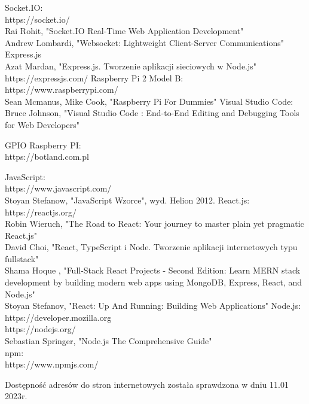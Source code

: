 \begin{thebibliography}{1}
 Socket.IO:
\\
https://socket.io/
\\
Rai Rohit, "Socket.IO Real-Time Web Application Development"
\\
Andrew Lombardi, "Websocket: Lightweight Client-Server Communications"
 Express.js
\\
Azat Mardan, "Express.js. Tworzenie aplikacji sieciowych w Node.js"
https://expressjs.com/
Raspberry Pi 2 Model B:
\\
https://www.raspberrypi.com/
\\
 Sean Mcmanus, Mike Cook, "Raspberry Pi For Dummies"
Visual Studio Code:
\\
Bruce Johnson, "Visual Studio Code : End-to-End Editing and Debugging Tools for Web Developers"

 GPIO Raspberry PI:
\\
https://botland.com.pl


 JavaScript:
\\
https://www.javascript.com/
\\
Stoyan Stefanow, "JavaScript Wzorce", wyd. Helion 2012.
React.js:
\\
https://reactjs.org/
\\
Robin Wieruch, "The Road to React: Your journey to master plain yet pragmatic React.js"
\\
David Choi, "React, TypeScript i Node. Tworzenie aplikacji internetowych typu fullstack"
\\
Shama Hoque , "Full-Stack React Projects - Second Edition: Learn MERN stack development by building modern web apps using MongoDB, Express, React, and Node.js"
\\
Stoyan Stefanov, "React: Up And Running: Building Web Applications"
Node.js:
\\
https://developer.mozilla.org
\\
https://nodejs.org/
\\
Sebastian Springer, "Node.js The Comprehensive Guide"
\\
 npm:
\\
https://www.npmjs.com/

Dostępność adresów do stron internetowych została sprawdzona w dniu 11.01 2023r.

\end{thebibliography}


